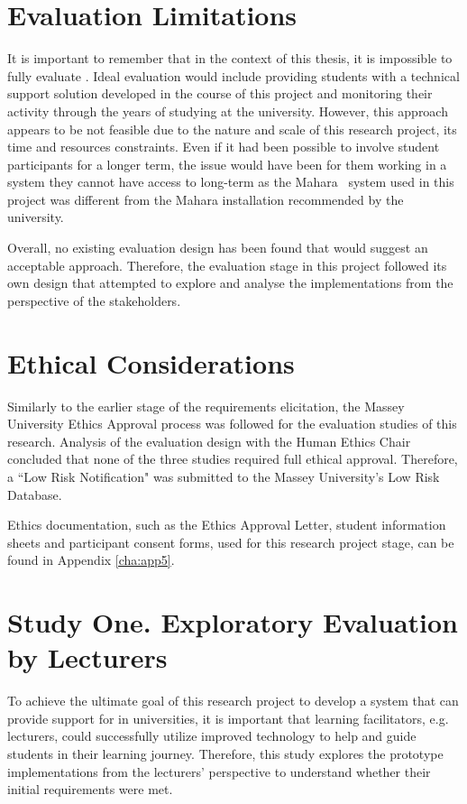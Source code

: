 \section{Evaluation Limitations}
\label{sec:evallimit}
It is important to remember that in the context of this thesis, it is
impossible to fully evaluate \LLLsn. Ideal evaluation would include providing
students with a technical support solution developed in the course of this
project and monitoring their activity through the years of studying at the
university. However, this approach appears to be not feasible due to the nature
and scale of this research project, its time and resources constraints. Even if
it had been possible to involve student participants for a longer term, the
issue would have been for them working in a system they cannot have access to
long-term as the Mahara \ep~system used in this project was different from the
Mahara installation recommended by the university.

Overall, no existing evaluation design has been found that would suggest an
acceptable approach. Therefore, the evaluation stage in this project followed
its own design that attempted to explore and analyse the implementations from
the perspective of the \LLLs stakeholders.

\section{Ethical Considerations}

Similarly to the earlier stage of the requirements elicitation, the Massey
University Ethics Approval process was followed for the evaluation studies of
this research. Analysis of the evaluation design with the Human Ethics Chair
concluded that none of the three studies required full ethical approval.
Therefore, a ``Low Risk Notification" was submitted to the Massey University's
Low Risk Database.

Ethics documentation, such as the Ethics Approval Letter, student information
sheets and participant consent forms, used for this research project stage, can
be found in Appendix \ref{cha:app5}.

\section{Study One. Exploratory Evaluation by Lecturers}
\label{sec:one}

To achieve the ultimate goal of this research project to develop a system that
can provide support for \LLLs in universities, it is important that learning
facilitators, e.g. lecturers, could successfully utilize improved technology to
help and guide students in their learning journey. Therefore, this study
explores the prototype implementations from the lecturers' perspective to
understand whether their initial requirements were met.

